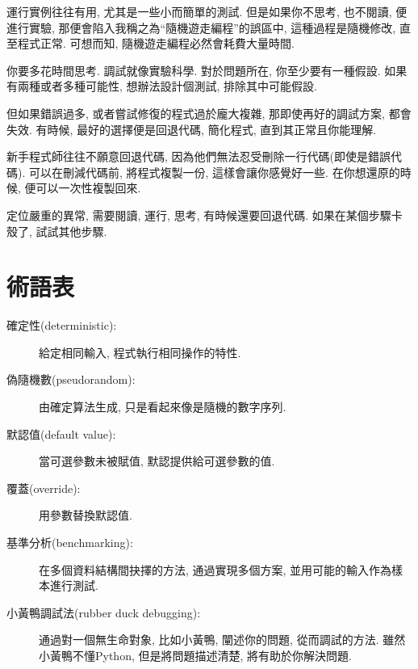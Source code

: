 \documentclass[10pt]{book}
\begin{document}
運行實例往往有用, 尤其是一些小而簡單的測試. 但是如果你不思考, 也不閱讀, 
便進行實驗, 那便會陷入我稱之為``隨機遊走編程''的誤區中, 
這種過程是隨機修改, 直至程式正常. 可想而知, 隨機遊走編程必然會耗費大量時間. 

你要多花時間思考. 
調試就像實驗科學. 
對於問題所在, 你至少要有一種假設. 
如果有兩種或者多種可能性, 想辦法設計個測試, 排除其中可能假設. 

但如果錯誤過多, 或者嘗試修復的程式過於龐大複雜, 
那即使再好的調試方案, 都會失效. 
有時候, 最好的選擇便是回退代碼, 簡化程式, 直到其正常且你能理解. 

新手程式師往往不願意回退代碼, 因為他們無法忍受刪除一行代碼(即使是錯誤代碼). 
可以在刪減代碼前, 將程式複製一份, 這樣會讓你感覺好一些. 
在你想還原的時候, 便可以一次性複製回來. 

定位嚴重的異常, 需要閱讀, 運行, 思考, 有時候還要回退代碼. 
如果在某個步驟卡殼了, 試試其他步驟. 


\section{術語表}

\begin{description}

\item[確定性(deterministic):] 給定相同輸入, 程式執行相同操作的特性. 

\item[偽隨機數(pseudorandom):] 由確定算法生成, 只是看起來像是隨機的數字序列. 

\item[默認值(default value):] 當可選參數未被賦值, 默認提供給可選參數的值. 

\item[覆蓋(override):] 用參數替換默認值. 

\item[基準分析(benchmarking):] 在多個資料結構間抉擇的方法, 通過實現多個方案, 
並用可能的輸入作為樣本進行測試. 

\item[小黃鴨調試法(rubber duck debugging):] 通過對一個無生命對象, 比如小黃鴨, 闡述你的問題, 
從而調試的方法. 雖然小黃鴨不懂Python, 但是將問題描述清楚, 將有助於你解決問題. 

\end{description}
\end{document}
